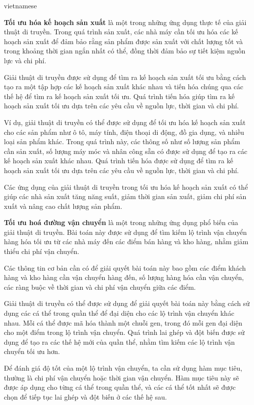 \documentclass[a4paper]{article}
\begin{document}
\begin{otherlanguage*}{vietnamese}
\begin{enumerate}[leftmargin=7pt]
\textbf{Tối ưu hóa kế hoạch sản xuất} là một trong những ứng dụng thực tế của giải thuật di truyền. Trong quá trình sản xuất, các nhà máy cần tối ưu hóa các kế hoạch sản xuất để đảm bảo rằng sản phẩm được sản xuất với chất lượng tốt và trong khoảng thời gian ngắn nhất có thể, đồng thời đảm bảo sự tiết kiệm nguồn lực và chi phí.

Giải thuật di truyền được sử dụng để tìm ra kế hoạch sản xuất tối ưu bằng cách tạo ra một tập hợp các kế hoạch sản xuất khác nhau và tiến hóa chúng qua các thế hệ để tìm ra kế hoạch sản xuất tối ưu. Quá trình tiến hóa giúp tìm ra kế hoạch sản xuất tối ưu dựa trên các yêu cầu về nguồn lực, thời gian và chi phí.

Ví dụ, giải thuật di truyền có thể được sử dụng để tối ưu hóa kế hoạch sản xuất cho các sản phẩm như ô tô, máy tính, điện thoại di động, đồ gia dụng, và nhiều loại sản phẩm khác. Trong quá trình này, các thông số như số lượng sản phẩm cần sản xuất, số lượng máy móc và nhân công sẵn có được sử dụng để tạo ra các kế hoạch sản xuất khác nhau. Quá trình tiến hóa được sử dụng để tìm ra kế hoạch sản xuất tối ưu dựa trên các yêu cầu về nguồn lực, thời gian và chi phí.

Các ứng dụng của giải thuật di truyền trong tối ưu hóa kế hoạch sản xuất có thể giúp các nhà sản xuất tăng năng suất, giảm thời gian sản xuất, giảm chi phí sản xuất và nâng cao chất lượng sản phẩm.

\textbf{Tối ưu hoá đường vận chuyển} là một trong những ứng dụng phổ biến của giải thuật di truyền. Bài toán này được sử dụng để tìm kiếm lộ trình vận chuyển hàng hóa tối ưu từ các nhà máy đến các điểm bán hàng và kho hàng, nhằm giảm thiểu chi phí vận chuyển.

Các thông tin cơ bản cần có để giải quyết bài toán này bao gồm các điểm khách hàng và kho hàng cần vận chuyển hàng đến, số lượng hàng hóa cần vận chuyển, các ràng buộc về thời gian và chi phí vận chuyển giữa các điểm.

Giải thuật di truyền có thể được sử dụng để giải quyết bài toán này bằng cách sử dụng các cá thể trong quần thể để đại diện cho các lộ trình vận chuyển khác nhau. Mỗi cá thể được mã hóa thành một chuỗi gen, trong đó mỗi gen đại diện cho một điểm trong lộ trình vận chuyển. Quá trình lai ghép và đột biến được sử dụng để tạo ra các thế hệ mới của quần thể, nhằm tìm kiếm các lộ trình vận chuyển tối ưu hơn.

Để đánh giá độ tốt của một lộ trình vận chuyển, ta cần sử dụng hàm mục tiêu, thường là chi phí vận chuyển hoặc thời gian vận chuyển. Hàm mục tiêu này sẽ được áp dụng cho từng cá thể trong quần thể, và các cá thể tốt nhất sẽ được chọn để tiếp tục lai ghép và đột biến ở các thế hệ sau.


\end{enumerate}
\end{otherlanguage*}
\end{document}
